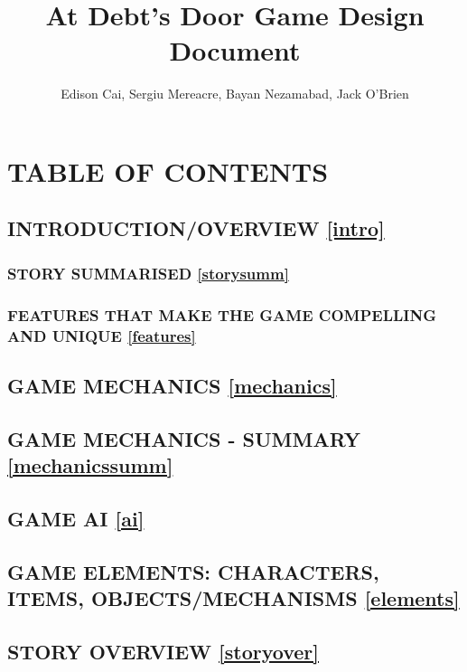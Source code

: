 \documentclass{article}
\author{Edison Cai, Sergiu Mereacre, Bayan Nezamabad, Jack O'Brien}
\title{At Debt's Door Game Design Document}
\begin{document}
\maketitle

\section{TABLE OF CONTENTS}

%

\subsection{INTRODUCTION/OVERVIEW \ref{intro}}

\subsubsection{STORY SUMMARISED \ref{storysumm}}

\subsubsection{FEATURES THAT MAKE THE GAME COMPELLING AND UNIQUE \ref{features}}

%

\subsection{GAME MECHANICS \ref{mechanics}}

%

\subsection{GAME MECHANICS - SUMMARY \ref{mechanicssumm}}

%

\subsection{GAME AI \ref{ai}}

%

\subsection{GAME ELEMENTS: CHARACTERS, ITEMS, OBJECTS/MECHANISMS \ref{elements}}

%

\subsection{STORY OVERVIEW \ref{storyover}}
\end{document}
